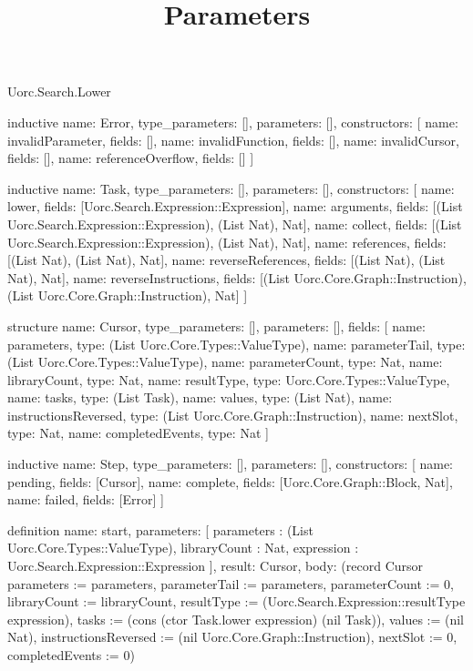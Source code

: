 \begin{lexlean}{Uorc.Search.Lower}
\title{Parameters}
\begin{semanticmodule}
inductive{
  name: Error,
  type_parameters: [],
  parameters: [],
  constructors: [
    {name: invalidParameter, fields: []},
    {name: invalidFunction, fields: []},
    {name: invalidCursor, fields: []},
    {name: referenceOverflow, fields: []}
  ]
}

inductive{
  name: Task,
  type_parameters: [],
  parameters: [],
  constructors: [
    {name: lower, fields: [Uorc.Search.Expression::Expression]},
    {name: arguments, fields: [(List Uorc.Search.Expression::Expression), (List Nat), Nat]},
    {name: collect, fields: [(List Uorc.Search.Expression::Expression), (List Nat), Nat]},
    {name: references, fields: [(List Nat), (List Nat), Nat]},
    {name: reverseReferences, fields: [(List Nat), (List Nat), Nat]},
    {
      name: reverseInstructions,
      fields: [(List Uorc.Core.Graph::Instruction), (List Uorc.Core.Graph::Instruction), Nat]
    }
  ]
}

structure{
  name: Cursor,
  type_parameters: [],
  parameters: [],
  fields: [
    {name: parameters, type: (List Uorc.Core.Types::ValueType)},
    {name: parameterTail, type: (List Uorc.Core.Types::ValueType)},
    {name: parameterCount, type: Nat},
    {name: libraryCount, type: Nat},
    {name: resultType, type: Uorc.Core.Types::ValueType},
    {name: tasks, type: (List Task)},
    {name: values, type: (List Nat)},
    {name: instructionsReversed, type: (List Uorc.Core.Graph::Instruction)},
    {name: nextSlot, type: Nat},
    {name: completedEvents, type: Nat}
  ]
}

inductive{
  name: Step,
  type_parameters: [],
  parameters: [],
  constructors: [
    {name: pending, fields: [Cursor]},
    {name: complete, fields: [Uorc.Core.Graph::Block, Nat]},
    {name: failed, fields: [Error]}
  ]
}

definition{
  name: start,
  parameters: [
    parameters : (List Uorc.Core.Types::ValueType),
    libraryCount : Nat,
    expression : Uorc.Search.Expression::Expression
  ],
  result: Cursor,
  body: (record Cursor {parameters := parameters, parameterTail := parameters, parameterCount := 0, libraryCount := libraryCount, resultType := (Uorc.Search.Expression::resultType expression), tasks := (cons (ctor Task.lower expression) (nil Task)), values := (nil Nat), instructionsReversed := (nil Uorc.Core.Graph::Instruction), nextSlot := 0, completedEvents := 0})
}


\end{semanticmodule}
\end{lexlean}
